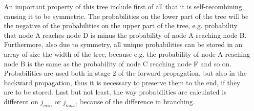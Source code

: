 An important property of this tree include first of all that it is self-recombining, causing it to be symmetric. The probabilities on the lower part of the tree will be the negative of the probabilities on the upper part of the tree, e.g. probability that node A reaches node D is minus the probability of node A reaching node B. Furthermore, also due to symmetry, all unique probabilities can be stored in an array of size the width of the tree, because e.g. the probability of node A reaching node B is the same as the probability of node C reaching node F and so on. Probabilities are used both in stage 2 of the forward propagation, but also in the backward propagation, thus it is necessary to preserve them to the end, if they are to be stored. Last but not least, the way probabilities are calculated is different on $j_{min}$ or $j_{max}$, because of the difference in branching. 

